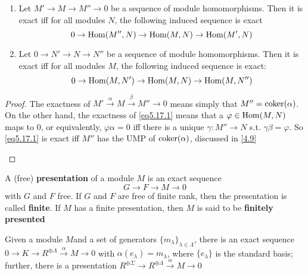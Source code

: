 \documentclass[11pt]{article}
\begin{document}
\begin{theorem}
\begin{enumerate}
\item Let \(M'\to M\to M''\to0\) be a sequence of module homomorphisms. Then it
is exact iff for all modules \(N\), the following induced sequence is
exact
\begin{equation}
0\to\operatorname{Hom}(M'',N)\to\operatorname{Hom}(M,N)\to\operatorname{Hom}(M',N)
\label{eq5.17.1}
\end{equation}
\item Let \(0\to N'\to N\to N''\) be a sequence of module homomorphisms. Then it
is exact iff for all modules \(M\), the following induced sequence is
exact:
\begin{equation*}
0\to\operatorname{Hom}(M,N')\to\operatorname{Hom}(M,N)\to\operatorname{Hom}(M,N'')
\end{equation*}
\end{enumerate}
\end{theorem}

\begin{proof}
The exactness of \(M'\xrightarrow{\alpha}M\xrightarrow{\beta}M''\to 0\) means simply
that \(M''=\operatorname{coker}(\alpha)\). On the other hand, the exactness of \eqref{eq5.17.1}
means that a \(\varphi\in\operatorname{Hom}(M,N)\) maps to 0, or equivalently,
\(\varphi\alpha=0\) iff there is a unique \(\gamma:M''\to N\) s.t.
\(\gamma\beta=\varphi\). So \eqref{eq5.17.1} is exact iff \(M''\) has the UMP
of \(\operatorname{coker}(\alpha)\), discussed in \ref{4.9}
\begin{center}
\end{center}
\end{proof}

\begin{definition}[]
A (free) \textbf{presentation} of a module \(M\) is an exact sequence
\begin{equation*}
G\to F\to M\to 0
\end{equation*}
with \(G\) and \(F\) free. If \(G\) and \(F\) are free of finite rank, then
the presentation is called \textbf{finite}. If \(M\) has a finite presentation, then
\(M\) is said to be \textbf{finitely presented}
\end{definition}

\begin{proposition}[]
\label{5.19}
Given a module \(M\)and a set of generators
\(\{m_\lambda\}_{\lambda\in\Lambda}\), there is an exact sequence
\(0\to K\to R^{\oplus\Lambda}\xrightarrow{\alpha}M\to0\) with
\(\alpha(e_\lambda)=m_\lambda\), where \(\{e_\lambda\}\) is the standard basis;
further, there is a presentation \(R^{\oplus\Sigma}\to R^{\oplus\Lambda}\xrightarrow{\alpha}M\to0\)
\end{proposition}
\end{document}
